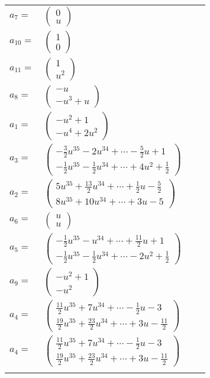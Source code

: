 \documentclass[1p]{elsarticle_modified}
\theoremstyle{definition}
\begin{document}
\begin{tabular}{m{7pt} m{180pt} m{7pt} m{180pt} }
\flushright $a_{7}=$&$\begin{pmatrix}0\\u\end{pmatrix}$ \\
\flushright $a_{10}=$&$\begin{pmatrix}1\\0\end{pmatrix}$ \\
\flushright $a_{11}=$&$\begin{pmatrix}1\\u^2\end{pmatrix}$ \\
\flushright $a_{8}=$&$\begin{pmatrix}- u\\- u^3+u\end{pmatrix}$ \\
\flushright $a_{1}=$&$\begin{pmatrix}- u^2+1\\- u^4+2 u^2\end{pmatrix}$ \\
\flushright $a_{3}=$&$\begin{pmatrix}-\frac{3}{2} u^{35}-2 u^{34}+\cdots-\frac{5}{2} u+1\\-\frac{1}{2} u^{35}-\frac{1}{2} u^{34}+\cdots+4 u^2+\frac{1}{2}\end{pmatrix}$ \\
\flushright $a_{2}=$&$\begin{pmatrix}5 u^{35}+\frac{13}{2} u^{34}+\cdots+\frac{1}{2} u-\frac{5}{2}\\8 u^{35}+10 u^{34}+\cdots+3 u-5\end{pmatrix}$ \\
\flushright $a_{6}=$&$\begin{pmatrix}u\\u\end{pmatrix}$ \\
\flushright $a_{5}=$&$\begin{pmatrix}-\frac{1}{2} u^{35}- u^{34}+\cdots+\frac{11}{2} u+1\\-\frac{1}{2} u^{35}-\frac{1}{2} u^{34}+\cdots-2 u^2+\frac{1}{2}\end{pmatrix}$ \\
\flushright $a_{9}=$&$\begin{pmatrix}- u^2+1\\- u^2\end{pmatrix}$ \\
\flushright $a_{4}=$&$\begin{pmatrix}\frac{11}{2} u^{35}+7 u^{34}+\cdots-\frac{1}{2} u-3\\\frac{19}{2} u^{35}+\frac{23}{2} u^{34}+\cdots+3 u-\frac{11}{2}\end{pmatrix}$\\ \flushright $a_{4}=$&$\begin{pmatrix}\frac{11}{2} u^{35}+7 u^{34}+\cdots-\frac{1}{2} u-3\\\frac{19}{2} u^{35}+\frac{23}{2} u^{34}+\cdots+3 u-\frac{11}{2}\end{pmatrix}$\\&\end{tabular}
\end{document}
